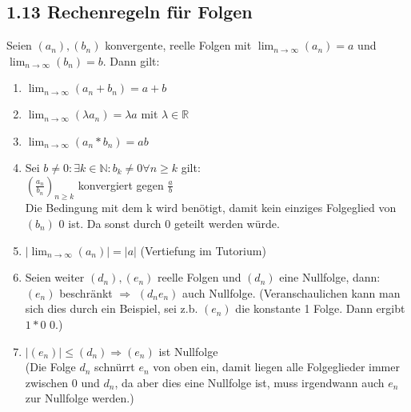 \documentclass[12pt]{article}
\begin{document}
\subsection*{1.13 Rechenregeln für Folgen}
Seien $(a_n), (b_n)$ konvergente, reelle Folgen mit $\lim_{n\to\infty} (a_n) = a$ und $\lim_{n\to\infty} (b_n) = b$. Dann gilt: 
\begin{enumerate}[\bfseries i)]
	\item $\lim_{n\to\infty} (a_n + b_n) = a + b$\\
	\item $\lim_{n\to\infty} (\lambda a_n) =\lambda a$ mit $\lambda \in \mathbb{R}$
	\item $\lim_{n\to\infty} (a_n * b_n) = ab$\\
	\item Sei $b\neq 0 : \exists k \in \mathbb{N} :b_k \neq 0 \forall n \geq k$ gilt:\\
			$(\frac{a_n}{b_n})_{n\geq k}$ konvergiert gegen $\frac{a}{b}$ \\
			Die Bedingung mit dem k wird benötigt, damit kein einziges Folgeglied von $(b_n)$ 0 ist. Da sonst durch 0 geteilt werden würde.\\
	\item $|\lim_{n\to\infty} (a_n)| = |a|$ (Vertiefung im Tutorium)\\
	\item Seien weiter $(d_n), (e_n)$ reelle Folgen und $(d_n)$ eine Nullfolge, dann:\\
	$(e_n)$ beschränkt $\Rightarrow$ $(d_n e_n)$ auch Nullfolge. (Veranschaulichen kann man sich dies durch ein Beispiel, sei z.b. $(e_n)$ die konstante 1 Folge. Dann ergibt $1*0$ 0.) \\
	\item $|(e_n)| \leq (d_n) \Rightarrow (e_n) $ ist Nullfolge\\
	(Die Folge $d_n$ schnürrt $e_n$ von oben ein, damit liegen alle Folgeglieder immer zwischen 0 und $d_n$, da aber dies eine Nullfolge ist, muss irgendwann auch $e_n$ zur Nullfolge werden.)
\end{enumerate}

\end{document}
